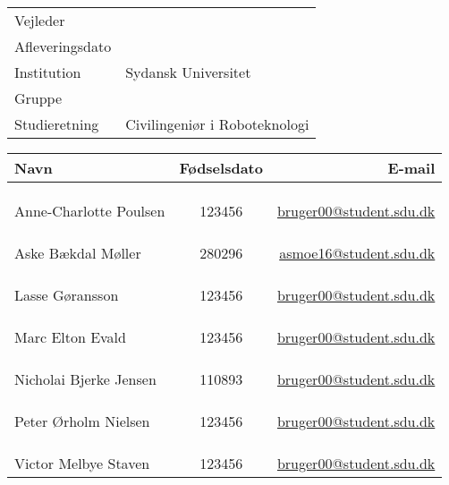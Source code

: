 \documentclass[../main.tex]{subfiles}
\begin{document}
\phantom{g}
\vspace{0.5cm}
\noindent
\begin{center}
\begin{Huge}
\textbf{\titel}
\end{Huge}
\\
\begin{huge}
\subtitel
\end{huge}
\\
\vspace{1cm}



\vspace{.7cm}

\begin{tabular}{@{} l l @{}}
\hline
Vejleder         		&	\vejleder          	\\
Afleveringsdato 			& 	\dato				\\
Institution             	&   Sydansk Universitet	\\
Gruppe                  	&	\gruppe				\\
Studieretning           	& 	Civilingeniør i Roboteknologi	\\
\hline
\end{tabular}
\thispagestyle{empty}

\vspace{1.5cm}


\newcommand{\fmedlem}[3]{%
\multicolumn{3}{c}{}\\
\multicolumn{3}{c}{}\\
\multicolumn{3}{c}{}\\
\hline
#1 & #2 & 	\href{mailto:#3@student.sdu.dk}{#3@student.sdu.dk}\\
}

\begin{tabular}{ l  c  r }

Navn						& Fødselsdato &	E-mail \\
\hline
\fmedlem{Anne-Charlotte Poulsen}{123456}{bruger00}
\fmedlem{Aske Bækdal Møller}{280296}{asmoe16}
\fmedlem{Lasse Gøransson}{123456}{bruger00}
\fmedlem{Marc Elton Evald}{123456}{bruger00}
\fmedlem{Nicholai Bjerke Jensen}{110893}{bruger00}
\fmedlem{Peter Ørholm Nielsen}{123456}{bruger00}
\fmedlem{Victor Melbye Staven}{123456}{bruger00}
\end{tabular}
\end{center}
\end{document}
